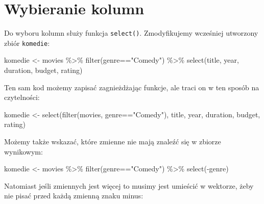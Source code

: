 \documentclass[
]{book}
\newenvironment{Shaded}{\begin{snugshade}}{\end{snugshade}}
\newcommand{\FunctionTok}[1]{\textcolor[rgb]{0.00,0.00,0.00}{#1}}
\newcommand{\NormalTok}[1]{#1}
\newcommand{\OtherTok}[1]{\textcolor[rgb]{0.56,0.35,0.01}{#1}}
\newcommand{\SpecialCharTok}[1]{\textcolor[rgb]{0.00,0.00,0.00}{#1}}
\newcommand{\StringTok}[1]{\textcolor[rgb]{0.31,0.60,0.02}{#1}}
\begin{document}
\hypertarget{wybieranie-kolumn}{%
\section{Wybieranie kolumn}\label{wybieranie-kolumn}}

Do wyboru kolumn służy funkcja \texttt{select()}. Zmodyfikujemy wcześniej utworzony zbiór \texttt{komedie}:

\begin{Shaded}
\begin{Highlighting}[]
\NormalTok{komedie }\OtherTok{\textless{}{-}}\NormalTok{ movies }\SpecialCharTok{\%\textgreater{}\%}
  \FunctionTok{filter}\NormalTok{(genre}\SpecialCharTok{==}\StringTok{"Comedy"}\NormalTok{) }\SpecialCharTok{\%\textgreater{}\%}
  \FunctionTok{select}\NormalTok{(title, year, duration, budget, rating)}
\end{Highlighting}
\end{Shaded}

Ten sam kod możemy zapisać zagnieżdżając funkcje, ale traci on w ten sposób na czytelności:

\begin{Shaded}
\begin{Highlighting}[]
\NormalTok{komedie }\OtherTok{\textless{}{-}} \FunctionTok{select}\NormalTok{(}\FunctionTok{filter}\NormalTok{(movies, genre}\SpecialCharTok{==}\StringTok{"Comedy"}\NormalTok{), title, year, duration, budget, rating)}
\end{Highlighting}
\end{Shaded}

Możemy także wskazać, które zmienne nie mają znaleźć się w zbiorze wynikowym:

\begin{Shaded}
\begin{Highlighting}[]
\NormalTok{komedie }\OtherTok{\textless{}{-}}\NormalTok{ movies }\SpecialCharTok{\%\textgreater{}\%}
  \FunctionTok{filter}\NormalTok{(genre}\SpecialCharTok{==}\StringTok{"Comedy"}\NormalTok{) }\SpecialCharTok{\%\textgreater{}\%}
  \FunctionTok{select}\NormalTok{(}\SpecialCharTok{{-}}\NormalTok{genre)}
\end{Highlighting}
\end{Shaded}

Natomiast jeśli zmiennych jest więcej to musimy jest umieścić w wektorze, żeby nie pisać przed każdą zmienną znaku minus:
\end{document}
